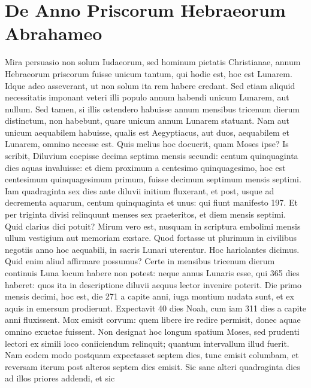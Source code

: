 \section{De Anno Priscorum Hebraeorum Abrahameo}
Mira persuasio non solum Iudaeorum, sed hominum pietatis
Christianae, annum Hebraeorum priscorum fuisse unicum tantum,
qui hodie est, hoc est Lunarem.
Idque adeo asseverant, ut
non solum ita rem habere credant.
Sed etiam aliquid necessitatis imponant
veteri illi populo annum habendi unicum Lunarem, aut nullum.
Sed tamen, si illis ostendero habuisse annum mensibus tricenum
dierum distinctum, non habebunt, quare unicum annum Lunarem
statuant.
Nam aut unicum aequabilem habuisse, qualis est Aegyptiacus,
aut duos, aequabilem et Lunarem, omnino necesse est.
Quis
melius hoc docuerit, quam Moses ipse?
Is scribit, Diluvium coepisse
decima septima mensis secundi: centum quinquaginta dies aquas
invaluisse: et diem proximum a centesimo quinquagesimo,
hoc est centesimum quinquagesimum primum, fuisse decimum
septimum mensis septimi.
%
Iam quadraginta sex dies ante diluvii initium
fluxerant, et post, usque ad decrementa aquarum, centum
quinquaginta et unus: qui fiunt manifesto 197.
Et per triginta divisi
relinquunt menses sex praeteritos, et diem  mensis septimi.
Quid clarius dici potuit?
Mirum vero est, nusquam in scriptura embolimi
mensis ullum vestigium aut memoriam exstare.
Quod fortasse
ut plurimum in civilibus negotiis anno hoc aequabili, in sacris Lunari
uterentur.
Hoc hariolantes dicimus.
Quid enim aliud affirmare
possumus?
Certe in mensibus tricenum dierum continuis Luna locum
habere non potest: neque annus Lunaris esse, qui 365 dies haberet:
quos ita in descriptione diluvii aequus lector invenire poterit.
Die primo mensis decimi, hoc est, die 271 a capite anni, iuga montium
nudata sunt, et ex aquis in emersum prodierunt.
Expectavit 40
dies Noah, cum iam 311 dies a capite anni fluxissent.
Mox emisit corvum:
quem libere ire redire permisit, donec aquae omnino exuctae
fuissent.
Non designat hoc longum spatium Moses, sed prudenti
lectori ex simili loco coniiciendum relinquit; quantum intervallum
illud fuerit.
Nam eodem modo postquam expectasset septem dies,
tunc emisit columbam, et reversam iterum post alteros septem dies
emisit.
Sic sane alteri quadraginta dies ad illos priores addendi, et sic
